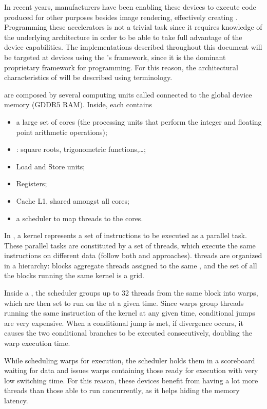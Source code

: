 In recent years, manufacturers have been enabling these devices to execute code produced for other purposes besides image rendering, effectively creating \gpgpus. Programming these accelerators is not a trivial task since it requires knowledge of the underlying architecture in order to be able to take full advantage of the device capabilities. The \gpu implementations described throughout this document will be targeted at \nvidia devices using the \nvidia's \cuda framework, since it is the dominant proprietary framework for \gpgpu programming. For this reason, the architectural characteristics of \gpgpus will be described using \cuda terminology.


\gpus are composed by several computing units called \sms connected to the global device memory (GDDR5 RAM). Inside, each \sm contains
\begin{itemize}
\item a large set of \cuda cores (the processing units that perform the integer and floating point arithmetic operations);
\item \sfus: square roots, trigonometric functions,\ldots;
\item Load and Store units;
\item Registers;
\item Cache L1, shared amongst all cores;
\item a scheduler to map threads to the cores.
\end{itemize}

In \cuda, a kernel represents a set of instructions to be executed as a parallel task. These parallel tasks are constituted by a set of \cuda threads, which execute the same instructions on different data (follow both \simd and \simt approaches). \cuda threads are organized in a hierarchy: blocks aggregate threads assigned to the same \sm, and the set of all the blocks running the same kernel is a grid.

Inside a \sm, the scheduler groups up to 32 threads from the same block into warps, which are then set to run on the \sm at a given time. Since warps group threads running the same instruction of the kernel at any given time, conditional jumps are very expensive. When a conditional jump is met, if divergence occurs, it causes the two conditional branches to be executed consecutively, doubling the warp execution time.

While scheduling warps for execution, the scheduler holds them in a scoreboard waiting for data and issues warps containing those ready for execution with very low switching time. For this reason, these devices benefit from having a lot more threads than those able to run concurrently, as it helps hiding the memory latency.

